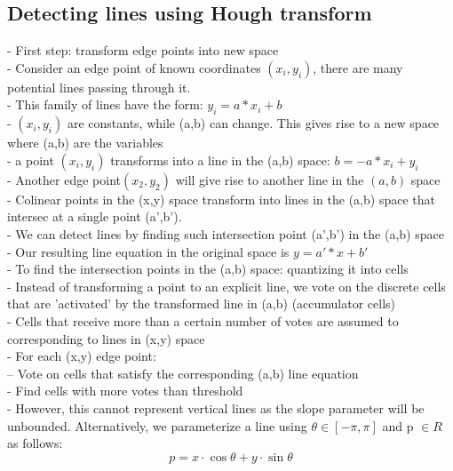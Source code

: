 \documentclass{article}
\begin{document}
\subsection*{Detecting lines using Hough transform}
- First step: transform edge points into new space \\
- Consider an edge point of known coordinates $(x_i, y_i)$, there are many potential lines passing through it. \\
- This family of lines have the form: $y_i = a*x_i+b$ \\
- $(x_i, y_i)$ are constants, while (a,b) can change. This gives rise to a new space where (a,b) are the variables \\
- a point $(x_i, y_i)$ transforms into a line in the (a,b) space: $b = -a * x_i + y_i$ \\
- Another edge point$(x_2, y_2)$ will give rise to another line in the $(a,b)$ space \\
- Colinear points in the (x,y) space transform into lines in the (a,b) space that intersec at a single point (a',b'). \\
- We can detect lines by finding such intersection point (a',b') in the (a,b) space \\
- Our resulting line equation in the original space is $y = a'*x +b'$ \\
- To find the intersection points in the (a,b) space: quantizing it into cells \\
- Instead of transforming a point to an explicit line, we vote on the discrete cells that are 'activated' by the transformed line in (a,b) (accumulator cells)\\
- Cells that receive more than a certain number of votes are assumed to corresponding to lines in (x,y) space \\
- For each (x,y) edge point: \\
-- Vote on cells that satisfy the corresponding (a,b) line equation \\
- Find cells with more votes than threshold \\
- However, this cannot represent vertical lines as the slope parameter will be unbounded. Alternatively, we parameterize a line using $\theta\in[-\pi,\pi]$ and p $\in R$ as follows:
$$p=x\cdot \cos{\theta}+y\cdot \sin{\theta}$$
\end{document}
